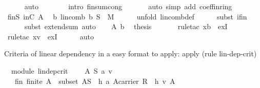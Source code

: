 \begin{isabellebody}
\ \ \ \ \isamarkupfalse%
\ auto\isanewline
\ \ \ \ \ \ \isamarkupfalse%
\ {\isacharparenleft}intro\ finsum{\isacharunderscore}cong{\isacharprime}{\isacharparenright}\ \isanewline
\ \ \ \ \isamarkupfalse%
\ {\isacharparenleft}auto\ simp\ add{\isacharcolon}\ coeff{\isacharunderscore}in{\isacharunderscore}ring{\isacharparenright}\ \ \isanewline
\ \ \isamarkupfalse%
\ finS\ inC\ A\ \isamarkupfalse%
\ b{\isacharcolon}\ {\isachardoublequoteopen}lincomb\ {\isacharquery}b\ S\ {\isacharequal}\ {\isasymzero}\isactrlbsub M\isactrlesub {\isachardoublequoteclose}\isanewline
\ \ \ \ \isamarkupfalse%
\ {\isacharparenleft}unfold\ lincomb{\isacharunderscore}def{\isacharparenright}\isanewline
\ \ \ \ \isamarkupfalse%
\ {\isacharparenleft}subst\ if{\isacharunderscore}in{\isacharparenright}\isanewline
\ \ \ \ \isamarkupfalse%
\ {\isacharparenleft}subst\ extend{\isacharunderscore}sum{\isacharcomma}\ auto{\isacharparenright}\isanewline
\ \ \isamarkupfalse%
\ A\ b\ \isamarkupfalse%
\ {\isacharquery}thesis\ \isanewline
\ \ \ \ \isamarkupfalse%
\ {\isacharparenleft}rule{\isacharunderscore}tac\ x{\isacharequal}{\isachardoublequoteopen}{\isacharquery}b{\isachardoublequoteclose}\ \ exI{\isacharparenright}\isanewline
\ \ \ \ \isamarkupfalse%
\ {\isacharparenleft}rule{\isacharunderscore}tac\ x{\isacharequal}{\isachardoublequoteopen}v{\isachardoublequoteclose}\ \ exI{\isacharparenright}\isanewline
\ \ \ \ \isamarkupfalse%
\ auto\isanewline
{}\isamarkupfalse%
%
\endisatagproof
{\isafoldproof}%
%
\isadelimproof
%
\endisadelimproof
%
\begin{isamarkuptext}%
Criteria of linear dependency in a easy format to apply: apply (rule lin-dep-crit)%
\end{isamarkuptext}%
\isamarkuptrue%
\isamarkupfalse%
\ {\isacharparenleft}\ module{\isacharparenright}\ lin{\isacharunderscore}dep{\isacharunderscore}crit{\isacharcolon}\ \isanewline
\ \ \ A\ S\ a\ v\isanewline
\ \ \ fin{\isacharcolon}\ {\isachardoublequoteopen}finite\ A{\isachardoublequoteclose}\ \ subset{\isacharcolon}\ {\isachardoublequoteopen}A{\isasymsubseteq}S{\isachardoublequoteclose}\ \ h{}{\isacharcolon}\ {\isachardoublequoteopen}{\isacharparenleft}a{\isasymin}\ {\isacharparenleft}A{\isasymrightarrow}carrier\ R{\isacharparenright}{\isacharparenright}{\isachardoublequoteclose}\ \ h{}{\isacharcolon}\ {\isachardoublequoteopen}v{\isasymin}\ A{\isachardoublequoteclose}\ \isanewline

\end{isabellebody}
